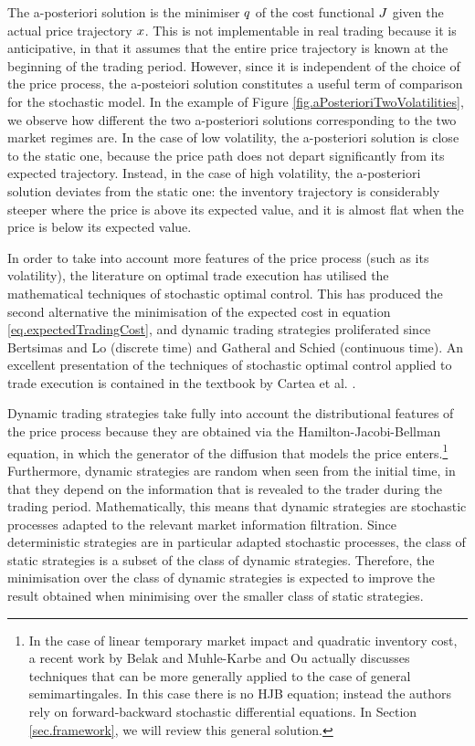 \documentclass[10pt,a4paper]{article}
\begin{document}
The a-posteriori solution  is the minimiser $q$ of the cost functional $J$ given the actual price trajectory $x$. This is not implementable in real trading because it is anticipative, in that it assumes that the entire price trajectory is known at the beginning of the trading period. However, since it is independent of the choice of the price process,  the a-posteiori solution constitutes a useful term of comparison for the stochastic model. In the example of Figure \ref{fig.aPosterioriTwoVolatilities}, we observe how different the two  a-posteriori solutions corresponding to the two market regimes are. In the case of low volatility, the a-posteriori solution is close to the static one, because the price path does not depart significantly from its expected trajectory. Instead, in the case of high volatility,  the a-posteriori solution deviates from the static one: the inventory trajectory is considerably steeper where the price is above its expected value, and it is almost flat when the price is below its expected value. 


In order to take into account more features of the price process (such as its volatility), the literature on optimal trade execution has utilised the mathematical techniques of stochastic optimal control. This has produced the second alternative the minimisation of the expected cost in equation \eqref{eq.expectedTradingCost}, and dynamic trading strategies proliferated since Bertsimas and Lo \cite{BL98opt} (discrete time) and  Gatheral and Schied \cite{GS11opt} (continuous time). An excellent presentation of the techniques of stochastic optimal control applied to trade execution is contained in the textbook by  Cartea et al. \cite{CJP15alg}. 

Dynamic trading strategies take fully into account the distributional features of the price process because they are obtained via the Hamilton-Jacobi-Bellman equation, in which the generator of the diffusion that models the price enters.\footnote{In the case of linear temporary market impact and quadratic inventory cost, a recent work by Belak and Muhle-Karbe and Ou \cite{BMO18opt} actually discusses techniques that can be more generally applied to the case of general semimartingales. In this case there is no HJB equation; instead the authors rely on forward-backward stochastic differential equations. In Section \ref{sec.framework}, we will review this general solution.}
Furthermore, dynamic strategies are  random when seen from the initial time, in that they depend   on the information that is revealed to the trader during the trading period. Mathematically, this means that dynamic strategies are stochastic processes adapted to the relevant market information filtration.  Since deterministic strategies are in particular adapted stochastic processes, the class of static strategies is a subset of the class of dynamic strategies. Therefore, the minimisation  over the class of dynamic strategies is expected to improve the result obtained when minimising over the smaller class of  static strategies.  
\end{document}
